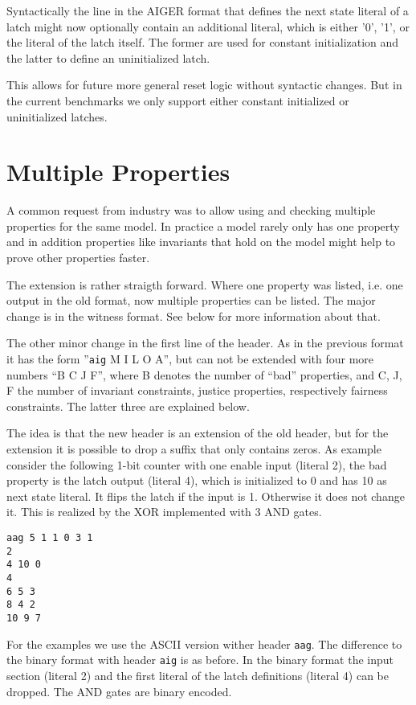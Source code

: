 \documentclass{llncs}
\begin{document}
Syntactically the line in the AIGER format that defines the next state
literal of a latch might now optionally contain an additional literal, which
is either '0', '1', or the literal of the latch itself.  The former are used
for constant initialization and the latter to define an uninitialized latch.

This allows for future more general reset logic without syntactic changes.
But in the current benchmarks we only support either constant initialized or
uninitialized latches.

\section{Multiple Properties}

A common request from industry was to allow using and checking multiple
properties for the same model.  In practice a model rarely only has one
property and in addition properties like invariants that hold on the model
might help to prove other properties faster.

The extension is rather straigth forward.  Where one property was listed,
i.e. one output in the old format, now multiple properties can be listed.
The major change is in the witness format.  See below for more information
about that.

The other minor change in the first line of the header.  As in the previous
format it has the form ''\texttt{aig} M I L O A'', but can not be
extended with four more numbers ``B C J F'', where B denotes the
number of ``bad'' properties, and C, J, F the number of
invariant constraints, justice properties, respectively fairness
constraints.  The latter three are explained below.

The idea is that the new header is an extension of the old header,
but for the extension it is possible to drop a suffix that only contains
zeros.  As example consider the following 1-bit counter with one enable
input (literal 2),  the bad property is the latch output (literal 4), which
is initialized to 0 and has 10 as next state literal.  It flips the latch if
the input is 1.  Otherwise it does not change it.  This is realized by the XOR
implemented with 3 AND gates.
{\small
\begin{verbatim}
aag 5 1 1 0 3 1
2
4 10 0
4
6 5 3
8 4 2
10 9 7
\end{verbatim}}
For the examples we use the ASCII
version wither header \texttt{aag}.  The difference to the binary format
with header \texttt{aig} is as before.  In the binary format
the input section (literal 2) and the first literal of the latch definitions
(literal 4) can be dropped.  The AND gates are binary encoded.
\end{document}
